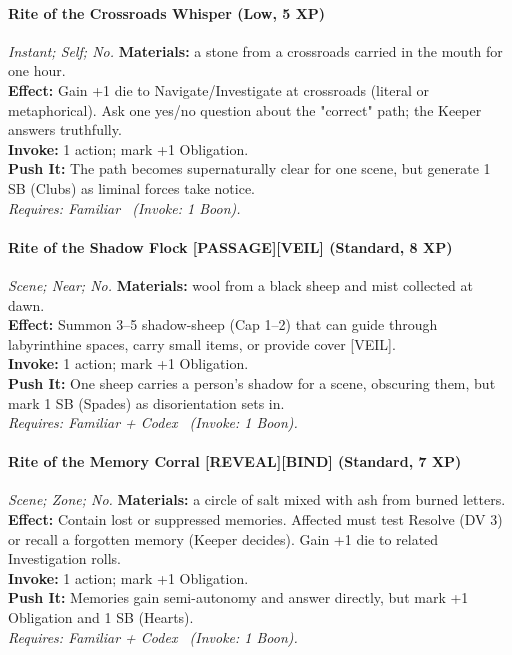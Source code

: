 \paragraph*{Rite of the Crossroads Whisper (Low, 5 XP)} \emph{Instant; Self; No.}
\textbf{Materials:} a stone from a crossroads carried in the mouth for one hour.\\
\textbf{Effect:} Gain +1 die to Navigate/Investigate at crossroads (literal or metaphorical). Ask one yes/no question about the "correct" path; the Keeper answers truthfully.\\
\textbf{Invoke:} 1 action; mark +1 Obligation.\\
\textbf{Push It:} The path becomes supernaturally clear for one scene, but generate 1 SB (Clubs) as liminal forces take notice.\\
\emph{Requires: Familiar \ (\textit{Invoke:} 1 Boon).}

\paragraph{Rite of the Shadow Flock \textnormal{[PASSAGE][VEIL]} (Standard, 8 XP)} \emph{Scene; Near; No.}
\textbf{Materials:} wool from a black sheep and mist collected at dawn.\\
\textbf{Effect:} Summon 3–5 shadow-sheep (Cap 1–2) that can guide through labyrinthine spaces, carry small items, or provide cover [VEIL].\\
\textbf{Invoke:} 1 action; mark +1 Obligation.\\
\textbf{Push It:} One sheep carries a person's shadow for a scene, obscuring them, but mark 1 SB (Spades) as disorientation sets in.\\
\emph{Requires: Familiar + Codex \ (\textit{Invoke:} 1 Boon).}

\paragraph{Rite of the Memory Corral \textnormal{[REVEAL][BIND]} (Standard, 7 XP)} \emph{Scene; Zone; No.}
\textbf{Materials:} a circle of salt mixed with ash from burned letters.\\
\textbf{Effect:} Contain lost or suppressed memories. Affected must test Resolve (DV 3) or recall a forgotten memory (Keeper decides). Gain +1 die to related Investigation rolls.\\
\textbf{Invoke:} 1 action; mark +1 Obligation.\\
\textbf{Push It:} Memories gain semi-autonomy and answer directly, but mark +1 Obligation and 1 SB (Hearts).\\
\emph{Requires: Familiar + Codex \ (\textit{Invoke:} 1 Boon).}

